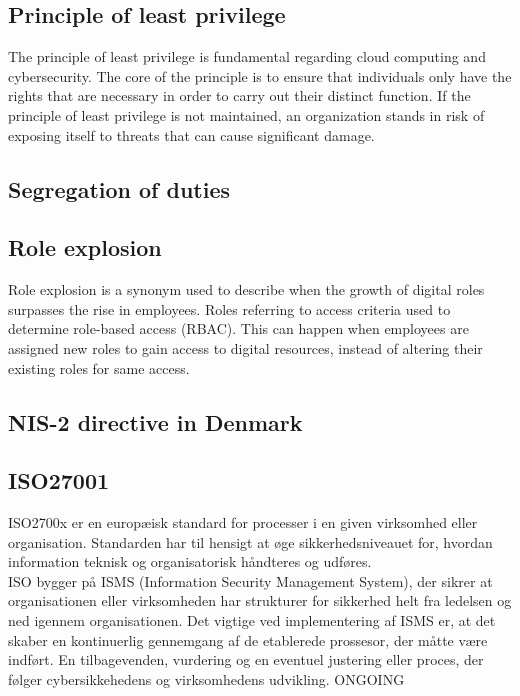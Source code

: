 \documentclass[12pt,a4paper]{article}
\begin{document}
\subsection{Principle of least privilege}
The principle of least privilege is fundamental regarding cloud computing and cybersecurity.\cite{PoLP} The core of the principle is to ensure that individuals only have the rights that are necessary in order to carry out their distinct function.\cite{PoLP} If the principle of least privilege is not maintained, an organization stands in risk of exposing itself to threats that can cause significant damage.\cite{PoLP}

\subsection{Segregation of duties}

\subsection{Role explosion}
Role explosion is a synonym used to describe when the growth of digital roles surpasses the rise in employees. Roles referring to access criteria used to determine role-based access (RBAC). This can happen when employees are assigned new roles to gain access to digital resources, instead of altering their existing roles for same access.\cite{role_explosion} 

\subsection{NIS-2 directive in Denmark}


\subsection{ISO27001}
ISO2700x er en europæisk standard for processer i en given virksomhed eller organisation. Standarden har til hensigt at øge sikkerhedsniveauet for, hvordan information teknisk og organisatorisk håndteres og udføres.\cite{IT_Sikkerhed_i_praksis}\\
ISO bygger på ISMS (Information Security Management System), der sikrer at organisationen eller virksomheden har strukturer for sikkerhed helt fra ledelsen og ned igennem organisationen. Det vigtige ved implementering af ISMS er, at det skaber en kontinuerlig gennemgang af de etablerede prossesor, der måtte være indført. En tilbagevenden, vurdering og en eventuel justering eller proces, der følger cybersikkehedens og virksomhedens udvikling.  ONGOING \cite{IT_Sikkerhed_i_praksis}
\end{document}
